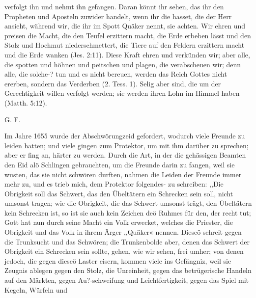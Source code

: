 {    verfolgt ihn und nehmt ihn gefangen. Daran könnt ihr sehen, das
    ihr den Propheten und Aposteln zuwider handelt, wenn ihr die hasset,
    die der Herr ansieht, während wir, die ihr im Spott Quäker
    nennt, sie achten. Wir ehren und preisen die Macht, die den
    Teufel erzittern macht, die Erde erbeben lässt und den Stolz und
    Hochmut niederschmettert, die Tiere auf den Feldern erzittern
    macht und die Erde wanken (Jes. 2:11). 
    Diese Kraft ehren
    und verkünden wir; aber alle, die spotten und höhnen und
    peitschen und plagen, die verabscheuen 
    wir; denn alle, die solche-?
    tun und es nicht bereuen, werden das Reich 
    Gottes nicht ererben,
    sondern das Verderben (2. Tess. 1).
    Selig aber sind, die um der Gerechtigkeit willen verfolgt
    werden; sie werden ihren Lohn im Himmel haben 
    (Matth. 5:12).

    \bigskip

    \begin{flushright}G. F.\end{flushright}
}

Im Jahre 1655 wurde der Abschwörungzeid gefordert, wodurch
viele Freunde zu leiden hatten; und viele gingen zum Protektor, um
mit ihm darüber zu sprechen; aber er fing an, härter zu werden.
Durch die Art, in der die gehässigen Beamten den Eid alö
Schlingen gebrauchten, um die Freunde darin zu fangen, weil sie
wusten, das sie nicht schwören durften, nahmen die Leiden der
Freunde immer mehr zu, und es trieb mich, dem Protektor folgendes-
zu schreiben:
,,Die Obrigkeit soll das Schwert, das den Übeltätern ein
Schrecken sein soll, nicht umsonst tragen; wie die Obrigkeit, die
das Schwert umsonst trägt, den Übeltätern kein Schrecken ist, so
ist sie auch kein Zeichen deö Ruhmes für den, der recht tut;
Gott hat nun durch seine Macht ein Volk erwecket, welches
die Priester, die Obrigkeit und das Volk in ihrem Ärger ,,Quäker«
nennen. Dieseö schreit gegen die Trunksucht und das Schwören;
die Trunkenbolde aber, denen das Schwert der Obrigkeit ein
Schrecken sein sollte, gehen, wie wir sehen, frei umher; von denen
jedoch, die gegen dieseö Laster eisern, kommen viele ins Gefängniz,
weil sie Zeugnis ablegen gegen den Stolz, die Unreinheit, gegen
das betrügerische Handeln auf den Märkten, gegen Au?-schweifung
und Leichtfertigkeit, gegen das Spiel mit Kegeln, Würfeln und


